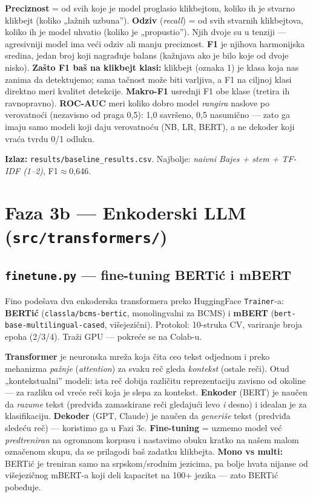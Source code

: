 \documentclass[11pt,a4paper]{article}
\newcommand{\kod}[1]{\texttt{#1}}
\begin{document}
\begin{teorija}
\textbf{Preciznost} = od svih koje je model proglasio klikbejtom, koliko ih je stvarno
klikbejt (koliko „lažnih uzbuna''). \textbf{Odziv} (\emph{recall}) = od svih stvarnih
klikbejtova, koliko ih je model uhvatio (koliko je „propustio''). Njih dvoje su u
tenziji --- agresivniji model ima veći odziv ali manju preciznost. \textbf{F1} je
njihova harmonijska sredina, jedan broj koji nagrađuje balans (kažnjava ako je bilo
koje od dvoje nisko). \textbf{Zašto F1 baš na klikbejt klasi:} klikbejt (oznaka 1) je
klasa koja nas zanima da detektujemo; sama tačnost može biti varljiva, a F1 na ciljnoj
klasi direktno meri kvalitet detekcije. \textbf{Makro-F1} usrednji F1 obe klase
(tretira ih ravnopravno). \textbf{ROC-AUC} meri koliko dobro model \emph{rangira}
naslove po verovatnoći (nezavisno od praga 0,5): 1,0 savršeno, 0,5 nasumično ---
zato ga imaju samo modeli koji daju verovatnoću (NB, LR, BERT), a ne dekoder koji
vraća tvrdu 0/1 odluku.
\end{teorija}

\textbf{Izlaz:} \kod{results/baseline\_results.csv}. Najbolje: \emph{naivni Bajes +
stem + TF-IDF (1--2)}, F1$\approx$0,646.

\section{Faza 3b --- Enkoderski LLM (\texttt{src/transformers/})}

\subsection{\texttt{finetune.py} --- fine-tuning BERTić i mBERT}
Fino podešava dva enkoderska transformera preko HuggingFace \kod{Trainer}-a:
\textbf{BERTić} (\kod{classla/bcms-bertic}, monolingvalni za BCMS) i \textbf{mBERT}
(\kod{bert-base-multilingual-cased}, višejezični). Protokol: 10-struka CV, variranje
broja epoha (2/3/4). Traži GPU --- pokreće se na Colab-u.

\begin{teorija}
\textbf{Transformer} je neuronska mreža koja čita ceo tekst odjednom i preko mehanizma
\emph{pažnje} (\emph{attention}) za svaku reč gleda \emph{kontekst} (ostale reči). Otud
„kontekstualni'' modeli: ista reč dobija različitu reprezentaciju zavisno od okoline ---
za razliku od vreće reči koja je slepa za kontekst. \textbf{Enkoder} (BERT) je naučen da
\emph{razume} tekst (predviđa zamaskirane reči gledajući levo \emph{i} desno) i idealan
je za klasifikaciju. \textbf{Dekoder} (GPT, Claude) je naučen da \emph{generiše} tekst
(predviđa sledeću reč) --- koristimo ga u Fazi 3c.
\textbf{Fine-tuning} = uzmemo model već \emph{predtreniran} na ogromnom korpusu i
nastavimo obuku kratko na našem malom označenom skupu, da se prilagodi baš zadatku
klikbejta. \textbf{Mono vs multi:} BERTić je treniran samo na srpskom/srodnim jezicima,
pa bolje hvata nijanse od višejezičnog mBERT-a koji deli kapacitet na 100+ jezika ---
zato BERTić pobeđuje.
\end{teorija}
\end{document}
